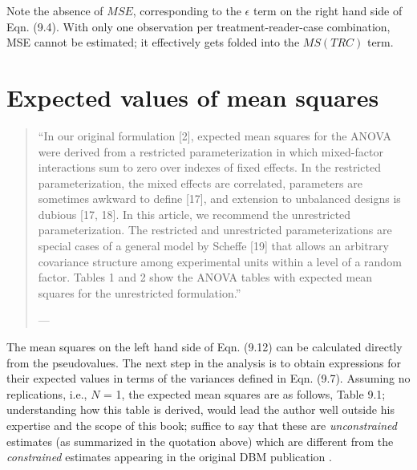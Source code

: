 \documentclass[
]{book}
\begin{document}
Note the absence of \(MSE\), corresponding to the \(\epsilon\) term on the right hand side of Eqn. (9.4). With only one observation per treatment-reader-case combination, MSE cannot be estimated; it effectively gets folded into the \(MS(TRC)\) term.

\hypertarget{expected-values-of-mean-squares}{%
\section{Expected values of mean squares}\label{expected-values-of-mean-squares}}

\begin{quote}
``In our original formulation {[}2{]}, expected mean squares for the ANOVA were derived from a restricted parameterization in which mixed-factor interactions sum to zero over indexes of fixed effects. In the restricted parameterization, the mixed effects are correlated, parameters are sometimes awkward to define {[}17{]}, and extension to unbalanced designs is dubious {[}17, 18{]}. In this article, we recommend the unrestricted parameterization. The restricted and unrestricted parameterizations are special cases of a general model by Scheffe {[}19{]} that allows an arbitrary covariance structure among experimental units within a level of a random factor. Tables 1 and 2 show the ANOVA tables with expected mean squares for the unrestricted formulation.''

--- \citep{RN2079}
\end{quote}

The mean squares on the left hand side of Eqn. (9.12) can be calculated directly from the pseudovalues. The next step in the analysis is to obtain expressions for their expected values in terms of the variances defined in Eqn. (9.7). Assuming no replications, i.e., \(N\) = 1, the expected mean squares are as follows, Table 9.1; understanding how this table is derived, would lead the author well outside his expertise and the scope of this book; suffice to say that these are \emph{unconstrained} estimates (as summarized in the quotation above) which are different from the \emph{constrained} estimates appearing in the original DBM publication \citep{RN204}.
\end{document}
